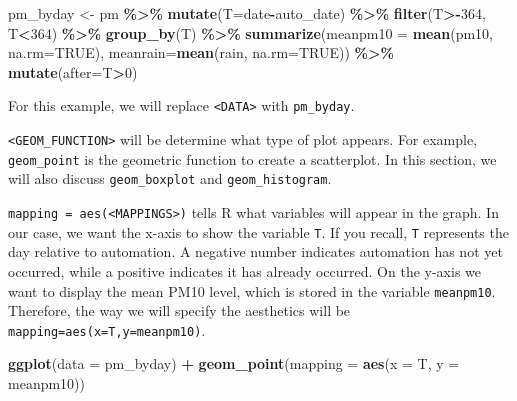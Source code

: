 \documentclass[
]{book}
\newenvironment{Shaded}{\begin{snugshade}}{\end{snugshade}}
\newcommand{\AttributeTok}[1]{\textcolor[rgb]{0.13,0.29,0.53}{#1}}
\newcommand{\ConstantTok}[1]{\textcolor[rgb]{0.56,0.35,0.01}{#1}}
\newcommand{\DecValTok}[1]{\textcolor[rgb]{0.00,0.00,0.81}{#1}}
\newcommand{\FunctionTok}[1]{\textcolor[rgb]{0.13,0.29,0.53}{\textbf{#1}}}
\newcommand{\NormalTok}[1]{#1}
\newcommand{\OtherTok}[1]{\textcolor[rgb]{0.56,0.35,0.01}{#1}}
\newcommand{\SpecialCharTok}[1]{\textcolor[rgb]{0.81,0.36,0.00}{\textbf{#1}}}
\begin{document}
\begin{Shaded}
\begin{Highlighting}[]
\NormalTok{pm\_byday }\OtherTok{\textless{}{-}}\NormalTok{ pm }\SpecialCharTok{\%\textgreater{}\%}
  \FunctionTok{mutate}\NormalTok{(}\AttributeTok{T=}\NormalTok{date}\SpecialCharTok{{-}}\NormalTok{auto\_date) }\SpecialCharTok{\%\textgreater{}\%}
  \FunctionTok{filter}\NormalTok{(T}\SpecialCharTok{\textgreater{}{-}}\DecValTok{364}\NormalTok{, T}\SpecialCharTok{\textless{}}\DecValTok{364}\NormalTok{) }\SpecialCharTok{\%\textgreater{}\%}
  \FunctionTok{group\_by}\NormalTok{(T) }\SpecialCharTok{\%\textgreater{}\%}
  \FunctionTok{summarize}\NormalTok{(}\AttributeTok{meanpm10 =} \FunctionTok{mean}\NormalTok{(pm10, }\AttributeTok{na.rm=}\ConstantTok{TRUE}\NormalTok{),}
    \AttributeTok{meanrain=}\FunctionTok{mean}\NormalTok{(rain, }\AttributeTok{na.rm=}\ConstantTok{TRUE}\NormalTok{)) }\SpecialCharTok{\%\textgreater{}\%}
  \FunctionTok{mutate}\NormalTok{(}\AttributeTok{after=}\NormalTok{T}\SpecialCharTok{\textgreater{}}\DecValTok{0}\NormalTok{)}
\end{Highlighting}
\end{Shaded}

For this example, we will replace \texttt{\textless{}DATA\textgreater{}} with \texttt{pm\_byday}.

\texttt{\textless{}GEOM\_FUNCTION\textgreater{}} will be determine what type of plot appears. For example, \texttt{geom\_point} is the geometric function to create a scatterplot. In this section, we will also discuss \texttt{geom\_boxplot} and \texttt{geom\_histogram}.

\texttt{mapping\ =\ aes(\textless{}MAPPINGS\textgreater{})} tells R what variables will appear in the graph. In our case, we want the x-axis to show the variable \texttt{T}. If you recall, \texttt{T} represents the day relative to automation. A negative number indicates automation has not yet occurred, while a positive indicates it has already occurred. On the y-axis we want to display the mean PM10 level, which is stored in the variable \texttt{meanpm10}. Therefore, the way we will specify the aesthetics will be \texttt{mapping=aes(x=T,y=meanpm10)}.

\begin{Shaded}
\begin{Highlighting}[]
\FunctionTok{ggplot}\NormalTok{(}\AttributeTok{data =}\NormalTok{ pm\_byday) }\SpecialCharTok{+} 
  \FunctionTok{geom\_point}\NormalTok{(}\AttributeTok{mapping =} \FunctionTok{aes}\NormalTok{(}\AttributeTok{x =}\NormalTok{ T, }\AttributeTok{y =}\NormalTok{ meanpm10))}
\end{Highlighting}
\end{Shaded}
\end{document}
